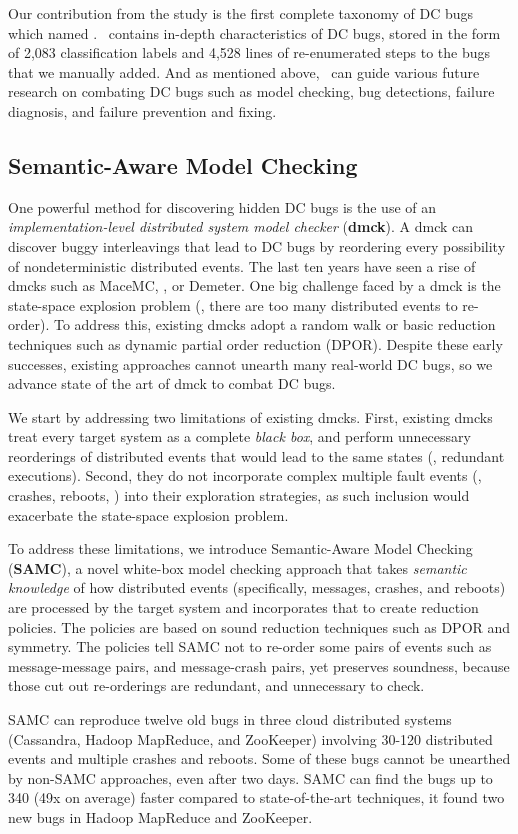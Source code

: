 Our contribution from the study is the first complete taxonomy of DC bugs which
named \taxdc. \taxdc\ contains in-depth characteristics of DC bugs, stored in
the form of 2,083 classification labels and 4,528 lines of re-enumerated steps
to the bugs that we manually added. And as mentioned above, \taxdc\ can guide
various future research on combating DC bugs such as model checking, bug
detections, failure diagnosis, and failure prevention and fixing.

\subsection{Semantic-Aware Model Checking}

One powerful method for discovering hidden DC bugs is the use of an
\textit{implementation-level distributed system model checker} (\textbf{dmck}).
A dmck can discover buggy interleavings that lead to DC bugs by reordering every
possibility of nondeterministic distributed events. The last ten years have seen
a rise of dmcks such as MaceMC, \modist, or Demeter. One big challenge faced by a
dmck is the state-space explosion problem (\ie, there are too many distributed
events to re-order). To address this, existing dmcks adopt a random walk or
basic reduction techniques such as dynamic partial order reduction (DPOR).
Despite these early successes, existing approaches cannot unearth many
real-world DC bugs, so we advance state of the art of dmck to combat DC bugs.

We start by addressing two limitations of existing dmcks. First, existing dmcks
treat every target system as a complete \textit{black box}, and perform
unnecessary reorderings of distributed events that would lead to the same states
(\ie, redundant executions). Second, they do not incorporate complex multiple
fault events (\eg, crashes, reboots, \etc) into their exploration strategies, as
such inclusion would exacerbate the state-space explosion problem.

To address these limitations, we introduce Semantic-Aware Model Checking
(\textbf{SAMC}), a novel white-box model checking approach that takes
\textit{semantic knowledge} of how distributed events (specifically, messages,
crashes, and reboots) are processed by the target system and incorporates that
to create reduction policies. The policies are based on sound reduction
techniques such as DPOR and symmetry. The policies tell SAMC not to re-order
some pairs of events such as message-message pairs, and message-crash pairs, yet
preserves soundness, because those cut out re-orderings are redundant, and
unnecessary to check.

SAMC can reproduce twelve old bugs in three cloud distributed systems
(Cassandra, Hadoop MapReduce, and ZooKeeper) involving 30-120 distributed events
and multiple crashes and reboots. Some of these bugs cannot be unearthed by
non-SAMC approaches, even after two days. SAMC can find the bugs up to 340 (49x
on average) faster compared to state-of-the-art techniques, it found two new
bugs in Hadoop MapReduce and ZooKeeper.

